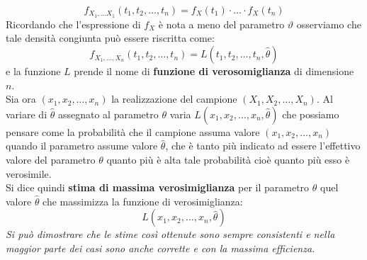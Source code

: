 \documentclass[a4paper,12pt, oneside]{book}
\begin{document}
\begin{enumerate}
  \[f_{X_{1}, \ldots X_{1}}\left(t_{1}, t_{2}, \ldots, t_{n}\right)=f_{X}\left(t_{1}\right) \cdot \ldots \cdot f_{X}\left(t_{n}\right)\]
  Ricordando che l’espressione di $f_X$ è nota a meno del parametro $\vartheta$ osserviamo che tale
  densità congiunta può essere riscritta come:
  \[f_{X_{1}, \ldots, X_{n}}\left(t_{1}, t_{2}, \ldots, t_{n}\right)=L\left(t_{1}, t_{2}, \ldots, t_{n}, \hat{\theta}\right)\]
  e la funzione $L$ prende il nome di \textbf{funzione di verosomiglianza} di dimensione $n$.\\
  Sia ora $\left(x_{1}, x_{2}, \ldots, x_{n}\right)$ la realizzazione del campione $\left(X_{1}, X_{2}, \ldots, X_{n}\right)$. Al variare di $\hat{\theta}$ assegnato al parametro $\theta$ varia $L\left(x_{1}, x_{2}, \ldots, x_{n}, \hat{\theta}\right)$
  che possiamo pensare come la probabilità che il campione assuma valore $\left(x_{1}, x_{2}, \ldots, x_{n}\right)$ quando il parametro assume valore $\hat{\theta}$, che è tanto più indicato ad essere l’effettivo valore del parametro $\theta$
  quanto più è alta tale probabilità cioè quanto più esso è verosimile.\\
  Si dice quindi \textbf{stima di massima verosimiglianza} per il parametro $\theta$ quel valore $\hat{\theta}$ che massimizza la funzione di verosimiglianza:
  \[L\left(x_{1}, x_{2}, \ldots, x_{n}, \hat{\theta}\right)\]
  \textit{Si può dimostrare che le stime così ottenute sono sempre consistenti e nella maggior
parte dei casi sono anche corrette e con la massima efficienza.}
\end{enumerate}
\end{document}
